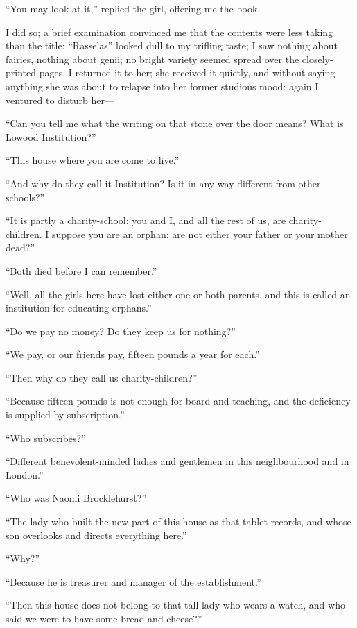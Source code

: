 \enquote{You may look at it,} replied the girl, offering me the book.

I did so; a brief examination convinced me that the contents were less
taking than the title: \enquote{Rasselas} looked dull to my trifling
taste; I saw nothing about fairies, nothing about genii; no bright
variety seemed spread over the closely-printed pages. I returned it to
her; she received it quietly, and without saying anything she was about
to relapse into her former studious mood: again I ventured to disturb
her---

\enquote{Can you tell me what the writing on that stone over the door
	means? What is Lowood Institution?}

\enquote{This house where you are come to live.}

\enquote{And why do they call it Institution? Is it in any way
	different from other schools?}

\enquote{It is partly a charity-school: you and I, and all the rest of
	us, are charity-children. I suppose you are an orphan: are not either
	your father or your mother dead?}

\enquote{Both died before I can remember.}

\enquote{Well, all the girls here have lost either one or both parents,
	and this is called an institution for educating orphans.}

\enquote{Do we pay no money? Do they keep us for nothing?}

\enquote{We pay, or our friends pay, fifteen pounds a year for each.}

\enquote{Then why do they call us charity-children?}

\enquote{Because fifteen pounds is not enough for board and teaching,
	and the deficiency is supplied by subscription.}

\enquote{Who subscribes?}

\enquote{Different benevolent-minded ladies and gentlemen in this
	neighbourhood and in London.}

\enquote{Who was Naomi Brocklehurst?}

\enquote{The lady who built the new part of this house as that tablet
	records, and whose son overlooks and directs everything here.}

\enquote{Why?}

\enquote{Because he is treasurer and manager of the establishment.}

\enquote{Then this house does not belong to that tall lady who wears a
	watch, and who said we were to have some bread and cheese?}

